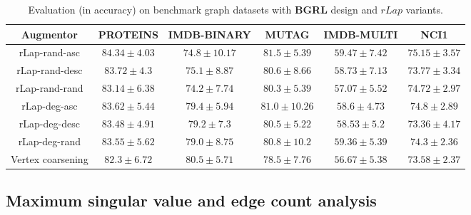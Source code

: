 \documentclass{article}
\theoremstyle{plain}
\theoremstyle{definition}
\theoremstyle{remark}
\begin{document}
\begin{table*}[ht!]
\centering
\caption{Evaluation (in accuracy) on benchmark graph datasets with \textbf{BGRL} design and $rLap$ variants.}
\label{table:rlap_ablation_bgrl}
\vskip 0.15in
\begin{center}
\begin{small}
\begin{sc}
\begin{tabular}{c|c|c|c|c|c}
\toprule
Augmentor & PROTEINS & IMDB-BINARY & MUTAG & IMDB-MULTI & NCI1\\
\midrule
rLap-rand-asc & $\mathbf{84.34 \pm 4.03}$ & $74.8 \pm 10.17$  & $\mathbf{81.5 \pm 5.39}$ & $\mathbf{59.47 \pm 7.42}$ & $\mathbf{75.15 \pm 3.57}$ \\
rLap-rand-desc & \underline{$83.72 \pm 4.3$} & $75.1 \pm 8.87$ & $80.6 \pm 8.66$ & $58.73 \pm 7.13$ & $73.77 \pm 3.34$  \\
rLap-rand-rand & $83.14 \pm 6.38$ & $74.2 \pm 7.74$ & $80.3 \pm 5.39$ & $57.07 \pm 5.52$ & $74.72 \pm 2.97$ \\
rLap-deg-asc & $83.62 \pm 5.44$ & \underline{$79.4 \pm 5.94$} & \underline{$81.0 \pm 10.26$} & $58.6 \pm 4.73$  & \underline{$74.8 \pm 2.89$} \\
rLap-deg-desc & $83.48 \pm 4.91$ & $79.2 \pm 7.3$  & $80.5 \pm 5.22$ & $58.53 \pm 5.2$ & $73.36 \pm 4.17$ \\
rLap-deg-rand & $83.55 \pm 5.62$ &  $79.0 \pm 8.75$ & $80.8 \pm 10.2$ & \underline{$59.36 \pm 5.39$} & $74.3 \pm 2.36$ \\
Vertex coarsening & $82.3 \pm 6.72$ & $\mathbf{80.5 \pm 5.71}$ & $78.5 \pm 7.76$ & $56.67 \pm 5.38$ & $73.58 \pm 2.37$ \\
\bottomrule
\end{tabular}
\end{sc}
\end{small}
\end{center}
\vskip -0.1in
\end{table*}

\subsection{Maximum singular value and edge count analysis}
\end{document}
